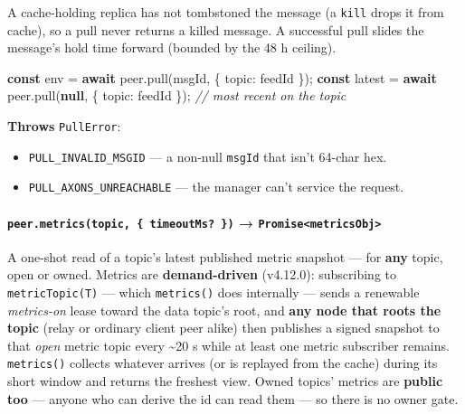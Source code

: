 \documentclass[
  nobib]{tufte-handout}
\newenvironment{Shaded}{}{}
\newcommand{\CommentTok}[1]{\textcolor[rgb]{0.38,0.63,0.69}{\textit{#1}}}
\newcommand{\ControlFlowTok}[1]{\textcolor[rgb]{0.00,0.44,0.13}{\textbf{#1}}}
\newcommand{\DataTypeTok}[1]{\textcolor[rgb]{0.56,0.13,0.00}{#1}}
\newcommand{\FunctionTok}[1]{\textcolor[rgb]{0.02,0.16,0.49}{#1}}
\newcommand{\KeywordTok}[1]{\textcolor[rgb]{0.00,0.44,0.13}{\textbf{#1}}}
\newcommand{\NormalTok}[1]{#1}
\newcommand{\OperatorTok}[1]{\textcolor[rgb]{0.40,0.40,0.40}{#1}}
\providecommand{\tightlist}{%
  \setlength{\itemsep}{0pt}\setlength{\parskip}{0pt}}
\begin{document}
A cache-holding replica has not tombstoned the message (a \texttt{kill}
drops it from cache), so a pull never returns a killed message. A
successful pull slides the message's hold time forward (bounded by the
48 h ceiling).

\begin{Shaded}
\begin{Highlighting}[]
\KeywordTok{const}\NormalTok{ env    }\OperatorTok{=} \ControlFlowTok{await}\NormalTok{ peer}\OperatorTok{.}\FunctionTok{pull}\NormalTok{(msgId}\OperatorTok{,}\NormalTok{ \{ }\DataTypeTok{topic}\OperatorTok{:}\NormalTok{ feedId \})}\OperatorTok{;}
\KeywordTok{const}\NormalTok{ latest }\OperatorTok{=} \ControlFlowTok{await}\NormalTok{ peer}\OperatorTok{.}\FunctionTok{pull}\NormalTok{(}\KeywordTok{null}\OperatorTok{,}\NormalTok{ \{ }\DataTypeTok{topic}\OperatorTok{:}\NormalTok{ feedId \})}\OperatorTok{;}   \CommentTok{// most recent on the topic}
\end{Highlighting}
\end{Shaded}

\textbf{Throws} \texttt{PullError}:

\begin{itemize}
\tightlist
\item
  \texttt{PULL\_INVALID\_MSGID} --- a non-null \texttt{msgId} that isn't
  64-char hex.
\item
  \texttt{PULL\_AXONS\_UNREACHABLE} --- the manager can't service the
  request.
\end{itemize}

\paragraph{\texorpdfstring{\texttt{peer.metrics(topic,\ \{\ timeoutMs?\ \})}
→
\texttt{Promise\textless{}metricsObj\textgreater{}}}{peer.metrics(topic, \{ timeoutMs? \}) → Promise\textless metricsObj\textgreater{}}}\label{peer.metricstopic-timeoutms-promisemetricsobj}

A one-shot read of a topic's latest published metric snapshot --- for
\textbf{any} topic, open or owned. Metrics are \textbf{demand-driven}
(v4.12.0): subscribing to \texttt{metricTopic(T)} --- which
\texttt{metrics()} does internally --- sends a renewable
\emph{metrics-on} lease toward the data topic's root, and \textbf{any
node that roots the topic} (relay or ordinary client peer alike) then
publishes a signed snapshot to that \emph{open} metric topic every
\textasciitilde20 s while at least one metric subscriber remains.
\texttt{metrics()} collects whatever arrives (or is replayed from the
cache) during its short window and returns the freshest view. Owned
topics' metrics are \textbf{public too} --- anyone who can derive the id
can read them --- so there is no owner gate.
\end{document}
